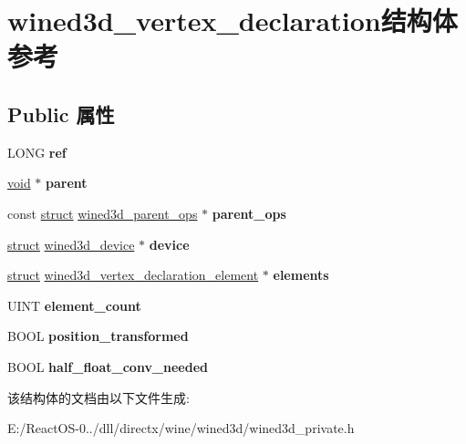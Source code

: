 \hypertarget{structwined3d__vertex__declaration}{}\section{wined3d\+\_\+vertex\+\_\+declaration结构体 参考}
\label{structwined3d__vertex__declaration}
\subsection*{Public 属性}
\begin{DoxyCompactItemize}
\item 
\mbox{\label{structwined3d__vertex__declaration_ad5c7ca1ce49d8c27dadb0c8a8d87fb92}} 
L\+O\+NG {\bfseries ref}
\item 
\mbox{\label{structwined3d__vertex__declaration_a5bc78766b3f3ccc307019d572ebf3a85}} 
\hyperlink{interfacevoid}{void} $\ast$ {\bfseries parent}
\item 
\mbox{\label{structwined3d__vertex__declaration_a5bcd0e79f1104146763b3e028a5d9dc9}} 
const \hyperlink{interfacestruct}{struct} \hyperlink{structwined3d__parent__ops}{wined3d\+\_\+parent\+\_\+ops} $\ast$ {\bfseries parent\+\_\+ops}
\item 
\mbox{\label{structwined3d__vertex__declaration_a2868457a2a2eb96d2c4f14f23fb7b298}} 
\hyperlink{interfacestruct}{struct} \hyperlink{structwined3d__device}{wined3d\+\_\+device} $\ast$ {\bfseries device}
\item 
\mbox{\label{structwined3d__vertex__declaration_a25bb8591d60af03b2260cb68693ca2ed}} 
\hyperlink{interfacestruct}{struct} \hyperlink{structwined3d__vertex__declaration__element}{wined3d\+\_\+vertex\+\_\+declaration\+\_\+element} $\ast$ {\bfseries elements}
\item 
\mbox{\label{structwined3d__vertex__declaration_aa4abd82b3520738412380315a9a166dd}} 
U\+I\+NT {\bfseries element\+\_\+count}
\item 
\mbox{\label{structwined3d__vertex__declaration_a4ea27656c87cc129b7bfb54e392a6fa3}} 
B\+O\+OL {\bfseries position\+\_\+transformed}
\item 
\mbox{\label{structwined3d__vertex__declaration_a8bc4c7e00f0b230e877f2a8365cb2ecb}} 
B\+O\+OL {\bfseries half\+\_\+float\+\_\+conv\+\_\+needed}
\end{DoxyCompactItemize}


该结构体的文档由以下文件生成\+:\begin{DoxyCompactItemize}
\item 
E\+:/\+React\+O\+S-\/0../dll/directx/wine/wined3d/wined3d\+\_\+private.\+h\end{DoxyCompactItemize}
